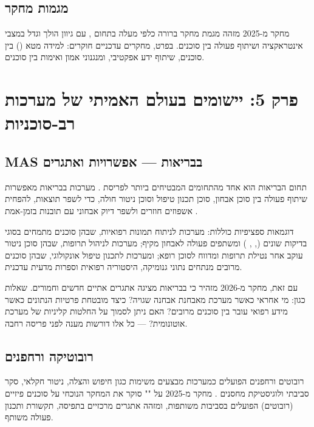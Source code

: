 \documentclass[12pt,a4paper]{article}
\begin{document}
\subsection{מגמות מחקר}

מחקר  מ-2025 \cite{ACM2025} מזהה מגמת מחקר ברורה כלפי מעלה בתחום , עם גיוון הולך וגדל במצבי אינטראקציה ושיתוף פעולה בין סוכנים. בפרט, מחקרים עדכניים חוקרים: למידה מטא () בין סוכנים, שיתוף ידע אפקטיבי, ומנגנוני אמון ואימות בין סוכנים.

\newpage

\section{פרק 5: יישומים בעולם האמיתי של מערכות רב-סוכניות}

\subsection{MAS בבריאות — אפשרויות ואתגרים}

תחום הבריאות הוא אחד מהתחומים המבטיחים ביותר לפריסת . מערכות  בבריאות מאפשרות שיתוף פעולה בין סוכן אבחון, סוכן תכנון טיפול וסוכן ניטור חולה, כדי לשפר תוצאות, להפחית אשפוזים חוזרים ולשפר דיוק אבחוני עם תובנות בזמן-אמת \cite{Pariveda2025}.

דוגמאות ספציפיות כוללות: מערכות  לניתוח תמונות רפואיות, שבהן סוכנים מתמחים בסוגי בדיקות שונים (, , ) ומשתפים פעולה לאבחון מקיף; מערכות לניהול תרופות, שבהן סוכן ניטור עוקב אחר נטילת תרופות ומדווח לסוכן רופא; ומערכות לתכנון טיפול אונקולוגי, שבהן סוכנים מרובים מנתחים נתוני גנומיקה, היסטוריה רפואית וספרות מדעית עדכנית.

עם זאת, מחקר  מ-2026 \cite{Frontiers2026} מזהיר כי  בבריאות מציגה אתגרים אתיים חדשים וחמורים. שאלות כגון: מי אחראי כאשר מערכת  מאבחנת אבחנה שגויה? כיצד מובטחת פרטיות הנתונים כאשר מידע רפואי עובר בין סוכנים מרובים? האם ניתן לסמוך על החלטות קליניות של מערכת אוטונומית? --- כל אלו דורשות מענה לפני פריסה רחבה.

\subsection{רובוטיקה ורחפנים}

רובוטים ורחפנים הפועלים כמערכות  מבצעים משימות כגון חיפוש והצלה, ניטור חקלאי, סקר סביבתי ולוגיסטיקת מחסנים \cite{EnkryptAI2025}. מחקר  מ-2025 \cite{arXiv2505} על "" סוקר את המחקר הנוכחי על סוכנים פיזיים (רובוטים) הפועלים בסביבות משותפות, ומזהה אתגרים מרכזיים בתפיסה, תקשורת ותכנון פעולה משותף.
\end{document}
